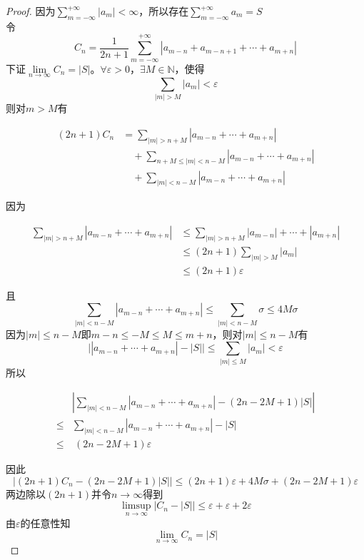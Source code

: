 \begin{proof}

    因为$\sum\limits_{m = -\infty}^{+\infty}{|a_m|} < \infty$，所以存在$\sum\limits_{m = -\infty}^{+\infty}{a_m} = S$\\
    令
    $$C_n = \dfrac{1}{2n + 1}\sum\limits_{m = -\infty}^{+\infty}{|a_{m -n} + a_{m - n + 1} + \cdots + a_{m + n}|}$$
    下证$\lim\limits_{n \to \infty}{C_n} = |S|$。$\forall \varepsilon > 0$，$\exists M \in \mathbb{N}$，使得
    $$\sum\limits_{|m| > M}{|a_m|} < \varepsilon$$
    则对$m > M$有

    \begin{align*}
        (2n + 1)C_n & = \sum\limits_{|m| > n + M}{|a_{m - n} + \cdots + a_{m + n}|} \\
        & \quad + \sum\limits_{n + M\leq |m| < n - M}{|a_{m - n} + \cdots + a_{m + n}|} \\
        & \quad + \sum\limits_{|m| < n - M}{|a_{m - n} + \cdots + a_{m + n}|}
    \end{align*}

    因为

    \begin{align*}
        \sum\limits_{|m| > n + M}{|a_{m - n} + \cdots + a_{m + n}|} & \leq \sum\limits_{|m| > n + M}{|a_{m - n}| + \cdots + |a_{m + n}|} \\
        & \leq (2n + 1)\sum\limits_{|m| > M}{|a_m|} \\
        & \leq (2n + 1)\varepsilon
    \end{align*}

    且
    $$\sum\limits_{|m| < n - M}{|a_{m - n} + \cdots + a_{m + n}|} \leq \sum\limits_{|m| < n - M}{\sigma} \leq 4M\sigma$$
    因为$|m| \leq n - M$即$m - n \leq -M \leq M \leq m + n$，则对$|m| \leq n - M$有
    $$\Big| |a_{m - n} + \cdots + a_{m + n}| - |S| \Big| \leq \sum\limits_{|m| \leq M}{|a_m|} < \varepsilon$$
    所以

    \begin{align*}
        & \left| \sum\limits_{|m| < n - M}{|a_{m - n} + \cdots + a_{m + n}|} - (2n - 2M + 1)|S| \right| \\
        \leq & \sum\limits_{|m| < n - M}{|a_{m - n} + \cdots + a_{m + n}| - |S|} \\
        \leq & \ (2n - 2M + 1)\varepsilon        
    \end{align*}

    因此
    $$\Big| (2n + 1)C_n - (2n - 2M + 1)|S| \Big| \leq (2n + 1)\varepsilon + 4M\sigma + (2n - 2M + 1)\varepsilon$$
    两边除以$(2n + 1)$并令$n \to \infty$得到
    $$\limsup\limits_{n \to \infty}{\Big|C_n - |S|\Big|} \leq \varepsilon + \varepsilon + 2\varepsilon$$
    由$\varepsilon$的任意性知
    $$\lim\limits_{n \to \infty}{C_n} = |S|$$

\end{proof}

